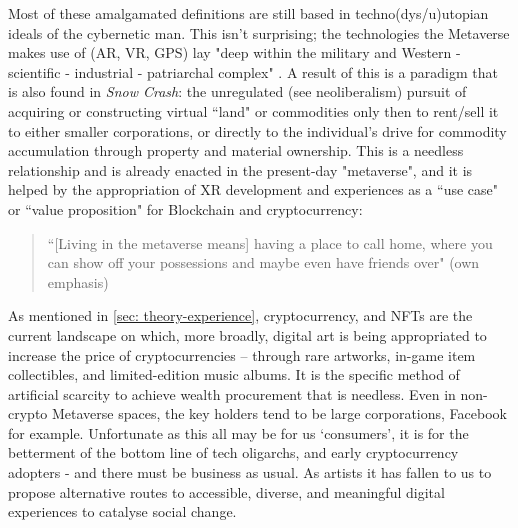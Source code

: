 Most of these amalgamated definitions are still based in techno(dys/u)utopian ideals of the cybernetic man. This isn't surprising; the technologies the Metaverse makes use of (AR, VR, GPS) lay "deep within the military and Western - scientific - industrial - patriarchal complex" \cite{davies2004}. A result of this is a paradigm that is also found in \textit{Snow Crash}: the unregulated (see neoliberalism) pursuit of acquiring or constructing virtual ``land" or commodities only then to rent/sell it to either smaller corporations, or directly to the individual's drive for commodity accumulation through property and material ownership. This is a needless relationship and is already enacted in the present-day "metaverse", and it is helped by the appropriation of XR development and experiences as a ``use case" or ``value proposition" for Blockchain and cryptocurrency:
\begin{quote}
    ``[Living in the metaverse means] having a place to call home, where you can show off your possessions and maybe even have friends over" (own emphasis) \citep[]{marr2022}
\end{quote}
As mentioned in \autoref{sec: theory-experience}, cryptocurrency, and NFTs are the current landscape on which, more broadly, digital art is being appropriated to increase the price of cryptocurrencies -- through rare artworks, in-game item collectibles, and limited-edition music albums. It is the specific method of artificial scarcity to achieve wealth procurement that is needless. Even in non-crypto Metaverse spaces, the key holders tend to be large corporations, Facebook for example. Unfortunate as this all may be for us `consumers', it is for the betterment of the bottom line of tech oligarchs, and early cryptocurrency adopters - and there must be business as usual. As artists it has fallen to us to propose alternative routes to accessible, diverse, and meaningful digital experiences to catalyse social change.

